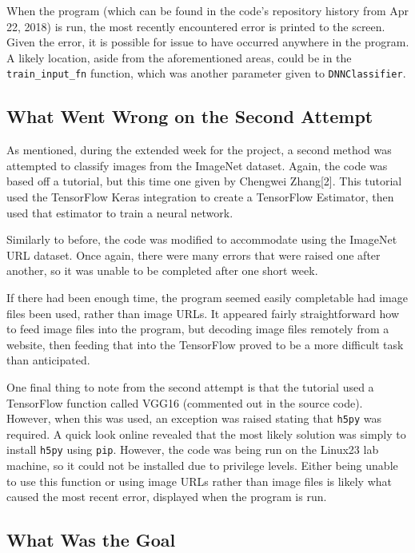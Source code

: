 \documentclass{article}
\begin{document}
When the program (which can be found in the code's repository history from
Apr 22, 2018) is run, the most recently encountered error is printed
to the screen. Given the error, it is possible for issue to have occurred
anywhere in the program. A likely location, aside from the aforementioned
areas, could be in the \texttt{train\_input\_fn} function, which was another parameter
given to \texttt{DNNClassifier}.

\subsection{What Went Wrong on the Second Attempt}

As mentioned, during the extended week for the project, a second method
was attempted to classify images from the ImageNet dataset. Again, the code
was based off a tutorial, but this time one given by Chengwei Zhang[2].
This tutorial used the TensorFlow Keras integration to create a
TensorFlow Estimator, then used that estimator to train a neural network.

Similarly to before, the code was modified to accommodate using the
ImageNet URL dataset. Once again, there were many errors that were raised
one after another, so it was unable to be completed after one short week.

If there had been enough time, the program seemed easily completable had
image files been used, rather than image URLs. It appeared fairly
straightforward how to feed image files into the program, but decoding
image files remotely from a website, then feeding that into the TensorFlow
proved to be a more difficult task than anticipated.

One final thing to note from the second attempt is that the tutorial used
a TensorFlow function called VGG16 (commented out in the source code).
However, when this was used, an exception was raised stating that 
\texttt{h5py} was required. A quick look online revealed that the most
likely solution was simply to install \texttt{h5py} using \texttt{pip}.
However, the code was being run on the Linux23 lab machine, so it could
not be installed due to privilege levels. Either being unable to use this
function or using image URLs rather than image files is likely what
caused the most recent error, displayed when the program is run.

\subsection{What Was the Goal}
\end{document}
